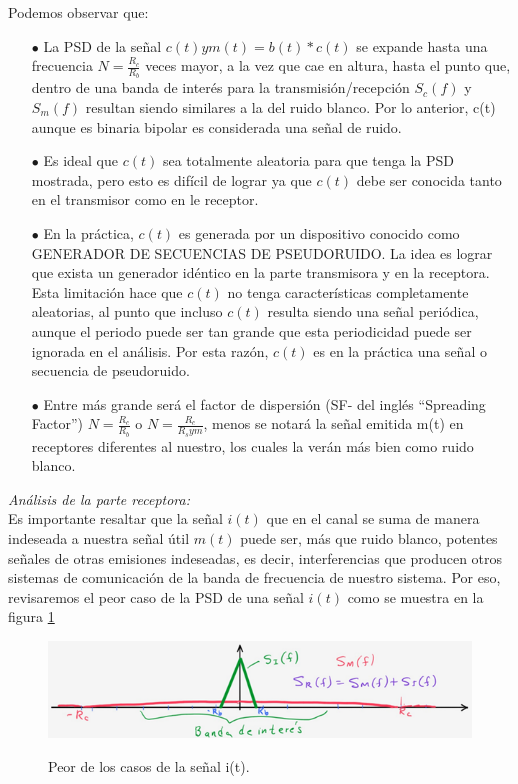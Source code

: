 Podemos observar que:

\begin{itemize}
	\item [$\bullet$] La PSD de la señal $c(t) y m(t)=b(t)*c(t)$ se expande hasta una frecuencia        $N=\frac{R_c}{R_b}$ veces mayor, a la vez que cae en altura, hasta el punto que, dentro de una banda de interés para la transmisión/recepción $S_c(f)$ y $S_m(f)$ resultan siendo similares a la del ruido blanco. Por lo anterior, c(t) aunque es binaria bipolar es considerada una señal de ruido.
	\item [$\bullet$] Es ideal que $c(t)$ sea totalmente aleatoria para que tenga la PSD mostrada, pero esto es difícil de lograr ya que $c(t)$ debe ser conocida tanto en el transmisor como en le receptor.
	\item [$\bullet$] En la práctica, $c(t)$ es generada por un dispositivo conocido como GENERADOR DE SECUENCIAS DE PSEUDORUIDO. La idea es lograr que exista un generador idéntico en la parte transmisora y en la receptora. Esta limitación hace que $c(t)$ no tenga características completamente aleatorias, al punto que incluso $c(t)$ resulta siendo una señal periódica, aunque el periodo puede ser tan grande que esta periodicidad puede ser ignorada en el análisis. Por esta razón, $c(t)$ es en la práctica una señal o secuencia de pseudoruido.
	\item [$\bullet$] Entre más grande será el factor de dispersión (SF- del inglés “Spreading Factor”)       $N=\frac{R_c}{R_b}$ o $N=\frac{R_c}{R_sym}$, menos se notará la señal emitida m(t) en receptores diferentes al nuestro, los cuales la verán más bien como ruido blanco.
\end{itemize}

\textit{Análisis de la parte receptora:}\\

Es importante resaltar que la señal $i(t)$ que en el canal se suma de manera indeseada a nuestra señal útil $m(t)$ puede ser, más que ruido blanco, potentes señales de otras emisiones indeseadas, es decir, interferencias que producen otros sistemas de comunicación de la banda de frecuencia de nuestro sistema. Por eso, revisaremos el peor caso de la PSD de una señal $i(t)$ como se muestra en la figura \ref{fig:Banda-triangulo} \\

\begin{figure}[h!]
	\captionsetup{justification = raggedright, singlelinecheck = false}
	\caption{Peor de los casos de la señal i(t).} 	\centering
	\includegraphics[scale=1]{Imagenes/Banda-triangulo.png}
	\label{fig:Banda-triangulo}
\end{figure}

